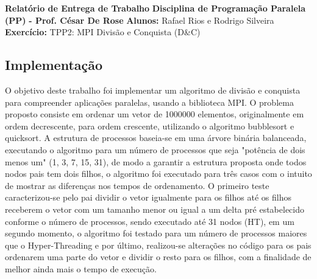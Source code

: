 \documentclass{article}
\begin{document}
\textbf{Relatório de Entrega de Trabalho} \newline
\textbf{Disciplina de Programação Paralela (PP)}\textbf{ - Prof. César De Rose} \newline
\textbf{Alunos:} Rafael Rios e Rodrigo Silveira \newline
\textbf{Exercício:} TPP2: MPI Divisão e Conquista (D&C) \newline

\begin{multicols*}{2}

\section{Implementação}
O objetivo deste trabalho foi implementar um algoritmo de divisão e conquista para compreender aplicações paralelas, usando a biblioteca MPI. O problema proposto consiste em ordenar um vetor de 1000000 elementos, originalmente em ordem decrescente, para ordem crescente, utilizando o algoritmo bubblesort e quicksort. A estrutura de processos baseia-se em uma árvore binária balanceada, executando o algoritmo para um número de processos que seja "potência de dois menos um" (1, 3, 7, 15, 31), de modo a garantir a estrutura proposta onde todos nodos pais tem dois filhos, o algoritmo foi executado para três casos com o intuito de mostrar as diferenças nos tempos de ordenamento. O primeiro teste caracterizou-se pelo pai dividir o vetor igualmente para os filhos até os filhos receberem o vetor com um tamanho menor ou igual a um delta pré estabelecido conforme o número de processos, sendo executado até 31 nodos (HT), em um segundo momento, o algoritmo foi testado para um número de processos maiores que o Hyper-Threading e por último, realizou-se alterações no código para os pais ordenarem uma parte do vetor e dividir o resto para os filhos, com a finalidade de melhor ainda mais o tempo de execução. \newline

\end{multicols*}
\end{document}
